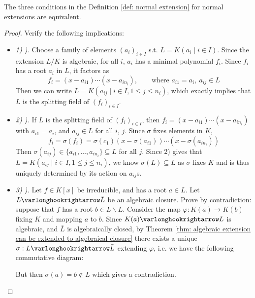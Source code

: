 \documentclass{article}
\begin{document}
\begin{proposition}
    The three conditions in the Definition \ref{def: normal extension} for normal extensions are equivalent. 
\end{proposition}

\begin{proof}
    Verify the following implications:
    \begin{itemize}
        \item \emph{1) ).} Choose a family of elements $(a_i)_{i \in I}$ s.t. $L = K(a_i \mid i \in I)$. Since the extension $L/K$ is algebraic, for all $i$, $a_i$ has a minimal polynomial $f_i$. Since $f_i$ has a root $a_i$ in $L$, it factors as
        \[
            f_i = (x - a_{i1}) \cdots (x - a_{i n_i}), \qquad \text{where } a_{i1} = a_i,\ a_{ij} \in L
        \]
        Then we can write $L = K(a_{ij} \mid i \in I, 1 \leq j \leq n_i)$, which exactly implies that $L$ is the splitting field of $(f_i)_{i \in I}$.
        \item \emph{2) ).} If $L$ is the splitting field of $(f_i)_{i \in I}$, then $f_i = (x - a_{i1}) \cdots (x - a_{i n_i})$ with $a_{i1} = a_i$, and $a_{ij} \in L$ for all $i$, $j$. Since $\sigma$ fixes elements in $K$, 
        \[
            f_i = \sigma(f_i) = \sigma(c_1) (x - \sigma(a_{i1})) \cdots (x - \sigma(a_{i n_i}))
        \]
        Then $\sigma(a_{ij}) \in \{a_{i1}, \dots, a_{i n_i}\} \subseteq L$ for all $j$. Since 2) gives that $L = K(a_{ij} \mid i \in I, 1 \leq j \leq n_i)$, we know $\sigma(L) \subseteq L$ as $\sigma$ fixes $K$ and is thus uniquely determined by its action on $a_{ij}$s.
        \item \emph{3) ).} Let $f \in K[x]$ be irreducible, and has a root $a \in L$. Let $L \ext \bar{L}$ be an algebraic closure. Prove by contradiction: suppose that $f$ has a root $b \in \bar{L} \smallsetminus L$. Consider the map $\varphi: K(a) \to K(b)$ fixing $K$ and mapping $a$ to $b$. Since $K(a) \ext L$ is algebraic, and $\bar{L}$ is algebraically closed, by Theorem \ref{thm: algebraic extension can be extended to algebraical closure} there exists a unique $\sigma: L \ext \bar{L}$ extending $\varphi$, i.e. we have the following commutative diagram:
        
        \begin{minipage}{\linewidth}
            \centering
        \end{minipage}
        But then $\sigma(a) = b \notin L$ which gives a contradiction.
    \end{itemize}
\end{proof}
\end{document}
